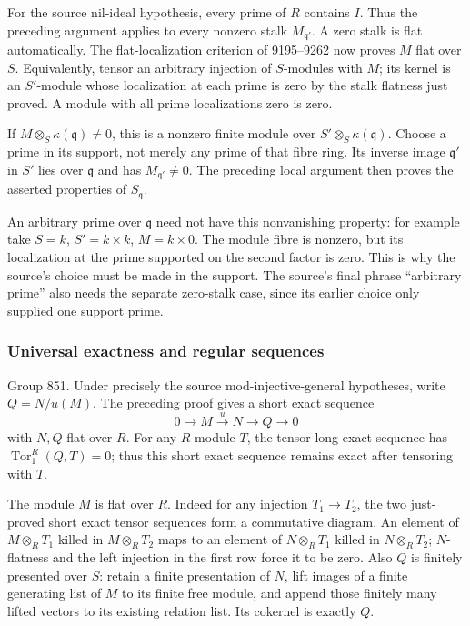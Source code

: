 For the source nil-ideal hypothesis, every prime of \(R\) contains \(I\). Thus the preceding argument applies to every nonzero stalk \(M_{\mathfrak q'}\). A zero stalk is flat automatically. The flat-localization criterion of 9195--9262 now proves \(M\) flat over \(S\). Equivalently, tensor an arbitrary injection of \(S\)-modules with \(M\); its kernel is an \(S'\)-module whose localization at each prime is zero by the stalk flatness just proved. A module with all prime localizations zero is zero.

If \(M\otimes_S\kappa(\mathfrak q)\ne0\), this is a nonzero finite module over \(S'\otimes_S\kappa(\mathfrak q)\). Choose a prime in its support, not merely any prime of that fibre ring. Its inverse image \(\mathfrak q'\) in \(S'\) lies over \(\mathfrak q\) and has \(M_{\mathfrak q'}\ne0\). The preceding local argument then proves the asserted properties of \(S_{\mathfrak q}\).

An arbitrary prime over \(\mathfrak q\) need not have this nonvanishing property: for example take \(S=k\), \(S'=k\times k\), \(M=k\times0\). The module fibre is nonzero, but its localization at the prime supported on the second factor is zero. This is why the source's choice must be made in the support. The source's final phrase ``arbitrary prime'' also needs the separate zero-stalk case, since its earlier choice only supplied one support prime.

\subsubsection{Universal exactness and regular sequences}\label{algebra-proof-038-universal-exactness-and-regular-sequences}

Group 851. Under precisely the source mod-injective-general hypotheses, write \(Q=N/u(M)\). The preceding proof gives a short exact sequence \[
0\longrightarrow M\xrightarrow{u}N\longrightarrow Q\longrightarrow0
\] with \(N,Q\) flat over \(R\). For any \(R\)-module \(T\), the tensor long exact sequence has \(\operatorname{Tor}_1^R(Q,T)=0\); thus this short exact sequence remains exact after tensoring with \(T\).

The module \(M\) is flat over \(R\). Indeed for any injection \(T_1\to T_2\), the two just-proved short exact tensor sequences form a commutative diagram. An element of \(M\otimes_R T_1\) killed in \(M\otimes_R T_2\) maps to an element of \(N\otimes_R T_1\) killed in \(N\otimes_R T_2\); \(N\)-flatness and the left injection in the first row force it to be zero. Also \(Q\) is finitely presented over \(S\): retain a finite presentation of \(N\), lift images of a finite generating list of \(M\) to its finite free module, and append those finitely many lifted vectors to its existing relation list. Its cokernel is exactly \(Q\).

